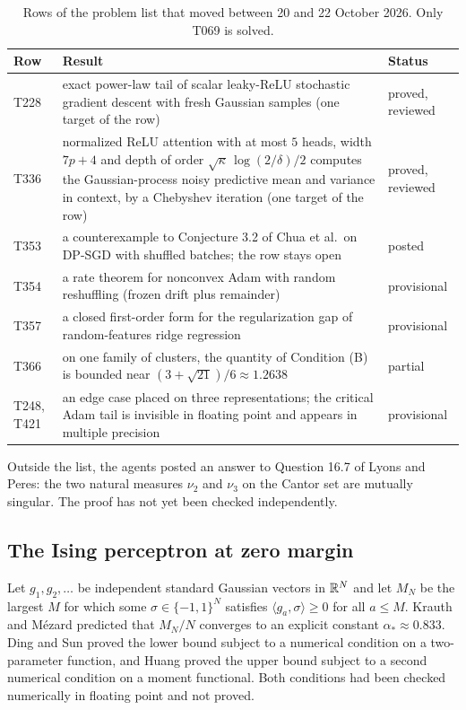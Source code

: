 \begin{table}[ht]
\centering\small
\begin{tabular}{lp{9.2cm}l}
\toprule
Row & Result & Status\\
\midrule
T228 & exact power-law tail of scalar leaky-ReLU stochastic gradient descent with fresh Gaussian samples (one target of the row) & proved, reviewed\\
T336 & normalized ReLU attention with at most $5$ heads, width $7p+4$ and depth of order $\sqrt\kappa\,\log(2/\delta)/2$ computes the Gaussian-process noisy predictive mean and variance in context, by a Chebyshev iteration (one target of the row) & proved, reviewed\\
T353 & a counterexample to Conjecture 3.2 of Chua et al.\ on DP-SGD with shuffled batches; the row stays open & posted\\
T354 & a rate theorem for nonconvex Adam with random reshuffling (frozen drift plus remainder) & provisional\\
T357 & a closed first-order form for the regularization gap of random-features ridge regression & provisional\\
T366 & on one family of clusters, the quantity of Condition (B) is bounded near $(3+\sqrt{21})/6\approx1.2638$ & partial\\
T248, T421 & an edge case placed on three representations; the critical Adam tail is invisible in floating point and appears in multiple precision & provisional\\
\bottomrule
\end{tabular}
\caption{Rows of the problem list that moved between 20 and 22 October 2026. Only T069 is solved.}
\label{tab:rows}
\end{table}

Outside the list, the agents posted an answer to Question 16.7 of Lyons and Peres: the two natural measures $\nu_2$ and $\nu_3$ on the Cantor set are mutually singular. The proof has not yet been checked independently.

\subsection{The Ising perceptron at zero margin}\label{subsec:perceptron}
Let $g_1,g_2,\dots$ be independent standard Gaussian vectors in $\mathbb{R}^N$ and let $M_N$ be the largest $M$ for which some $\sigma\in\{-1,1\}^N$ satisfies $\langle g_a,\sigma\rangle\ge0$ for all $a\le M$. Krauth and M\'ezard \cite{KrauthMezard1989} predicted that $M_N/N$ converges to an explicit constant $\alpha_*\approx0.833$. Ding and Sun \cite{DingSun2019} proved the lower bound subject to a numerical condition on a two-parameter function, and Huang \cite{Huang2024} proved the upper bound subject to a second numerical condition on a moment functional. Both conditions had been checked numerically in floating point and not proved.

